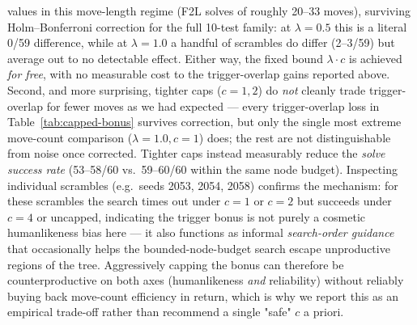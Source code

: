 \documentclass[10pt,conference]{article}
\begin{document}
values in this move-length regime (F2L solves of roughly 20--33
moves), surviving Holm--Bonferroni correction for the full
10-test family: at $\lambda=0.5$ this is a literal 0/59 difference,
while at $\lambda=1.0$ a handful of scrambles do differ (2--3/59) but
average out to no detectable effect. Either way, the fixed bound
$\lambda \cdot c$ is achieved \emph{for free}, with no measurable
cost to the trigger-overlap gains reported above. Second, and more
surprising, tighter caps ($c=1,2$) do \emph{not} cleanly trade
trigger-overlap for fewer moves as we had expected --- every
trigger-overlap loss in Table~\ref{tab:capped-bonus} survives
correction, but only the single most extreme move-count comparison
($\lambda=1.0,c=1$) does; the rest are not distinguishable from noise
once corrected. Tighter caps instead measurably reduce the
\emph{solve success rate} (53--58/60 vs.\ 59--60/60 within the same
node budget). Inspecting individual scrambles (e.g.\ seeds 2053,
2054, 2058) confirms the mechanism: for these scrambles the search
times out under $c=1$ or $c=2$ but succeeds under $c=4$ or uncapped,
indicating the trigger bonus is not purely a cosmetic humanlikeness
bias here --- it also functions as informal \emph{search-order
guidance} that occasionally helps the bounded-node-budget search
escape unproductive regions of the tree. Aggressively capping the
bonus can therefore be counterproductive on both axes (humanlikeness
\emph{and} reliability) without reliably buying back move-count
efficiency in return, which is why we report this as an empirical
trade-off rather than recommend a single "safe" $c$ a priori.
\end{document}
